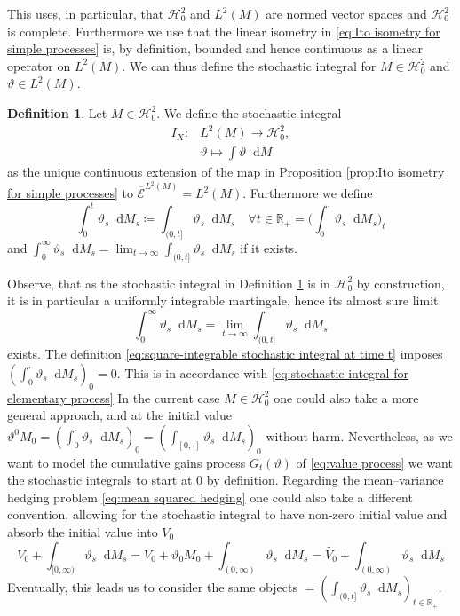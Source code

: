 \documentclass[11pt,a4paper,twoside,openany]{report}
\numberwithin{equation}{section}
\newcommand{\diff}{\mathop{}\!\mathrm{d}}
\theoremstyle{plain} %
\theoremstyle{definition} %
\newtheorem{definition}[theorem]{Definition}
\theoremstyle{remark} %
\begin{document}
This uses, in particular, that \(\mathcal{H}_0^2\) and \(L^2(M)\) are normed vector spaces and \(\mathcal{H}_0^2\) is complete. Furthermore we use that the linear isometry in \eqref{eq:Ito isometry for simple processes} is, by definition, bounded and hence continuous as a linear operator on \(L^2(M)\). We can thus define the stochastic integral for \(M\in\mathcal{H}^2_0\) and \(\vartheta\in L^2(M)\).
\begin{definition}\label{def:square-integrable stochastic integral}
    Let \(M\in\mathcal{H}^2_{0}\). We define the stochastic integral
    \begin{align*}
        I_X:&L^2(M)\to\mathcal{H}^2_{0},\\
        &\vartheta\mapsto\int \vartheta\diff M
    \end{align*}
    as the unique continuous extension of the map in Proposition \ref{prop:Ito isometry for simple processes} to \(\overline{\mathcal{E}}^{L^2(M)}=L^2(M)\).  Furthermore we define
    \begin{equation}\label{eq:square-integrable stochastic integral at time t}
            \int_0^t\vartheta_s\diff M_s\coloneqq \int_{(0,t]}\vartheta_s\diff M_s\quad\forall t\in\mathbb{R}_+=\bigg( \int_0^\cdot\vartheta_s\diff M_s\bigg)_{t}
    \end{equation}
    and \(\int_0^\infty\vartheta_s\diff M_s=\lim_{t\to\infty}\int_{(0,t]}\vartheta_s\diff M_s\) if it exists.
\end{definition}
Observe, that as the stochastic integral in Definition \ref{def:square-integrable stochastic integral} is in \(\mathcal{H}^2_0\) by construction, it is in particular a uniformly integrable martingale, hence its almost sure limit 
\begin{equation*}
    \int_0^\infty\vartheta_s\diff M_s=\lim_{t\to\infty}\int_{(0,t]}\vartheta_s\diff M_s
\end{equation*}
exists. The definition \eqref{eq:square-integrable stochastic integral at time t} imposes \(( \int_0^\cdot\vartheta_s\diff M_s)_{0}=0\). This is in accordance with \eqref{eq:stochastic integral for elementary process} In the current case \(M\in\mathcal{H}^2_0\) one could also take a more general approach, and at the initial value \(\vartheta^0M_0=( \int_0^\cdot\vartheta_s\diff M_s)_{0}=(\int_{[0,\cdot]}\vartheta_s\diff M_s)_0\) without harm. Nevertheless, as we want to model the cumulative gains process \(G_{t}(\vartheta)\) of \eqref{eq:value process} we want the stochastic integrals to start at \(0\) by definition. Regarding the mean--variance hedging problem \eqref{eq:mean squared hedging} one could also take a different convention, allowing for the stochastic integral to have non-zero initial value and absorb the initial value into \(V_0\)
\begin{equation*}
 V_0+\int_{[0,\infty)}\vartheta_s\diff M_s=V_0+\vartheta_0M_0+\int_{(0,\infty)}\vartheta_s\diff M_s=\widetilde{V_0}+\int_{(0,\infty)}\vartheta_s\diff M_s   
\end{equation*}
Eventually, this leads us to consider the same objects \(=(\int_{(0,t]}\vartheta_s\diff M_s)_{t\in\mathbb{R}_+}\). 
\end{document}
